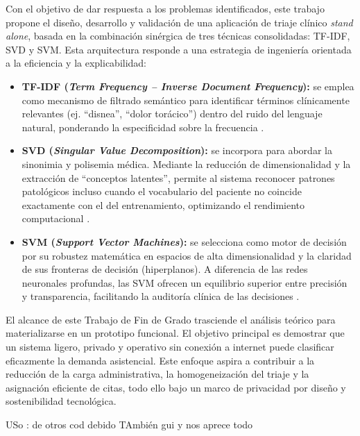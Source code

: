 Con el objetivo de dar respuesta a los problemas identificados, este trabajo propone el diseño, desarrollo y validación de una aplicación de triaje clínico \textit{stand alone}, basada en la combinación sinérgica de tres técnicas consolidadas: TF-IDF, SVD y SVM. Esta arquitectura responde a una estrategia de ingeniería orientada a la eficiencia y la explicabilidad:

\begin{itemize}
	\item \textbf{TF-IDF (\textit{Term Frequency -- Inverse Document Frequency}):} se emplea como mecanismo de filtrado semántico para identificar términos clínicamente relevantes (ej. ``disnea'', ``dolor torácico'') dentro del ruido del lenguaje natural, ponderando la especificidad sobre la frecuencia \cite{arxivTFIDF2308}.
	\item \textbf{SVD (\textit{Singular Value Decomposition}):} se incorpora para abordar la sinonimia y polisemia médica. Mediante la reducción de dimensionalidad y la extracción de ``conceptos latentes'', permite al sistema reconocer patrones patológicos incluso cuando el vocabulario del paciente no coincide exactamente con el del entrenamiento, optimizando el rendimiento computacional \cite{mediumSVDNLP}.
	\item \textbf{SVM (\textit{Support Vector Machines}):} se selecciona como motor de decisión por su robustez matemática en espacios de alta dimensionalidad y la claridad de sus fronteras de decisión (hiperplanos). A diferencia de las redes neuronales profundas, las SVM ofrecen un equilibrio superior entre precisión y transparencia, facilitando la auditoría clínica de las decisiones \cite{svmVsLlmDiva2024}.
\end{itemize}

El alcance de este Trabajo de Fin de Grado trasciende el análisis teórico para materializarse en un prototipo funcional. El objetivo principal es demostrar que un sistema ligero, privado y operativo sin conexión a internet puede clasificar eficazmente la demanda asistencial. Este enfoque aspira a contribuir a la reducción de la carga administrativa, la homogeneización del triaje y la asignación eficiente de citas, todo ello bajo un marco de privacidad por diseño y sostenibilidad tecnológica.


USo : de otros \acrshort{cod} debido
TAmbién \acrfull{gui}  y nos aprece todo
